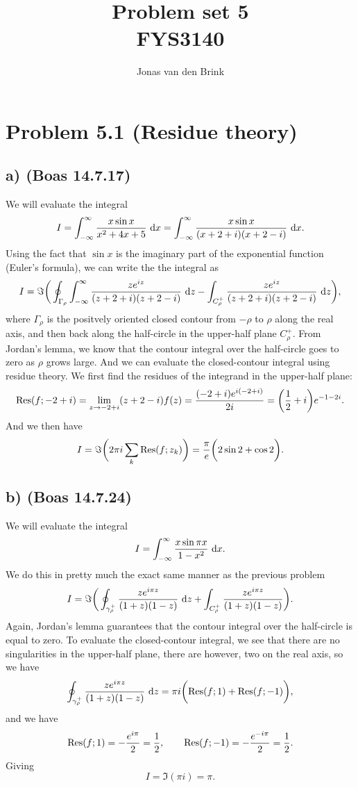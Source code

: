 \documentclass[a4paper, 11pt, titlepage, english]{article}
\author{Jonas van den Brink}
\title{Problem set 5 \\ FYS3140}
\renewcommand{\d}{{\rm d}}
\newcommand{\Res}[2]{{\rm Res}(#1;#2)}
\begin{document}
\maketitle
% 

\section*{Problem 5.1 (Residue theory)}

\subsection*{a) (Boas 14.7.17)}
We will evaluate the integral
$$I = \int_{-\infty}^\infty \frac{x \sin x}{x^2 + 4x + 5} \ \d x = \int_{-\infty}^\infty \frac{x \sin x}{(x+2+i)(x+2-i)} \ \d x.$$
Using the fact that $\sin x$ is the imaginary part of the exponential function (Euler's formula), we can write the the integral as
$$I = \Im \bigg(\oint_{\Gamma_\rho} \int_{-\infty}^\infty \frac{z e^{iz}}{(z+2+i)(z+2-i)} \ \d z - \int_{C_\rho^+} \frac{z e^{iz}}{(z+2+i)(z+2-i)} \ \d z\bigg),$$
where $\Gamma_\rho$ is the positvely oriented closed contour from $-\rho$ to $\rho$ along the real axis, and then back along the half-circle in the upper-half plane $C_\rho^+$. From Jordan's lemma, we know that the contour integral over the half-circle goes to zero as $\rho$ grows large. And we can evaluate the closed-contour integral using residue theory. We first find the residues of the integrand in the upper-half plane:
$$\Res{f}{-2+i} = \lim_{z\to -2+i} (z+2-i)f(z) = \frac{(-2+i)e^{i(-2+i)}}{2i} = \bigg(\frac{1}{2}+i\bigg)e^{-1-2i}.$$
And we then have 
$$I = \Im\bigg(2\pi i \sum_k \Res{f}{z_k}\bigg) =  \frac{\pi}{e}\bigg(2\sin 2 + \cos 2\bigg).$$

\subsection*{b) (Boas 14.7.24)}
We will evaluate the integral
$$I = \int_{-\infty}^\infty \frac{x \sin \pi x}{1-x^2} \ \d x.$$
We do this in pretty much the exact same manner as the previous problem
$$I = \Im \bigg( \oint_{\gamma^+_\rho} \frac{z e^{i\pi z}}{(1+z)(1-z)} \ \d z + \int_{C^+_\rho} \frac{z e^{i\pi z}}{(1+z)(1-z)} \bigg).$$
Again, Jordan's lemma guarantees that the contour integral over the half-circle is equal to zero. To evaluate the closed-contour integral, we see that there are no singularities in the upper-half plane, there are however, two on the real axis, so we have
$$ \oint_{\gamma^+_\rho} \frac{z e^{i\pi z}}{(1+z)(1-z)} \ \d z = \pi i \bigg( \Res{f}{1} + \Res{f}{-1}\bigg),$$
and we have
$$\Res{f}{1} = -\frac{e^{i\pi}}{2} = \frac{1}{2}, \qquad \Res{f}{-1} = -\frac{e^{-i\pi}}{2} = \frac{1}{2}.$$
Giving
$$ I = \Im(\pi i) = \pi.$$
\end{document}
